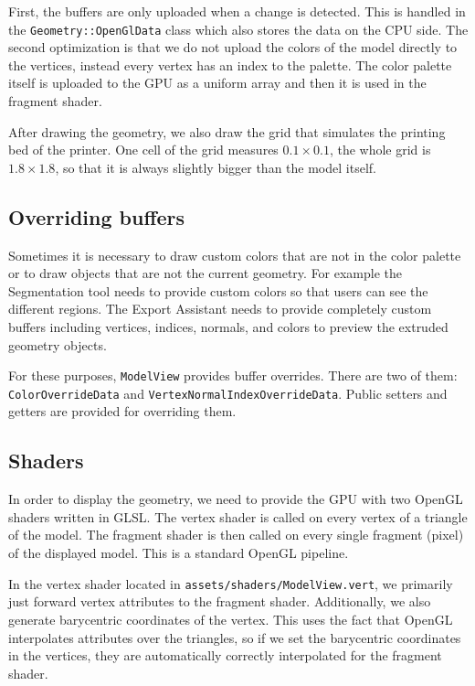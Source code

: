 First, the buffers are only uploaded when a change is detected.
This is handled in the \texttt{Geometry::OpenGlData} class which also stores the data on the CPU side.
The second optimization is that we do not upload the colors of the model directly to the vertices, instead every vertex has an index to the palette.
The color palette itself is uploaded to the GPU as a uniform array and then it is used in the fragment shader.

After drawing the geometry, we also draw the grid that simulates the printing bed of the printer.
One cell of the grid measures $0.1\times{}0.1$, the whole grid is $1.8\times{}1.8$, so that it is always slightly bigger than the model itself.

\subsection{Overriding buffers}

Sometimes it is necessary to draw custom colors that are not in the color palette or to draw objects that are not the current geometry.
For example the Segmentation tool needs to provide custom colors so that users can see the different regions.
The Export Assistant needs to provide completely custom buffers including vertices, indices, normals, and colors to preview the extruded geometry objects.

For these purposes, \texttt{ModelView} provides buffer overrides.
There are two of them: \texttt{ColorOverrideData} and \texttt{VertexNormalIndexOverrideData}.
Public setters and getters are provided for overriding them.

\subsection{Shaders}

In order to display the geometry, we need to provide the GPU with two OpenGL shaders written in GLSL.
The vertex shader is called on every vertex of a triangle of the model.
The fragment shader is then called on every single fragment (pixel) of the displayed model.
This is a standard OpenGL pipeline.

In the vertex shader located in \texttt{assets/shaders/ModelView.vert}, we primarily just forward vertex attributes to the fragment shader.
Additionally, we also generate barycentric coordinates of the vertex.
This uses the fact that OpenGL interpolates attributes over the triangles, so if we set the barycentric coordinates in the vertices, they are automatically correctly interpolated for the fragment shader.

